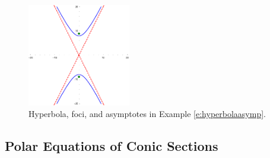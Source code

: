 \documentclass[letterpaper, 11pt, openany]{book}
\theoremstyle{mytheoremstyle}
\theoremstyle{myexamplestyle}
\begin{document}
\begin{figure}[htbp]
    \centering
        \includegraphics[width=0.4\textwidth]{Figures/hyperbolaasymp.pdf}
    \caption{Hyperbola, foci, and asymptotes in Example \ref{e:hyperbolaasymp}.}
    \label{f:hyperbolaasymp}
\end{figure}

\subsection{Polar Equations of Conic Sections}
\end{document}
